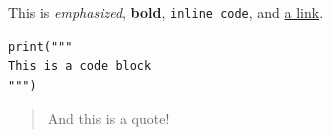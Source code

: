 

This is \textit{emphasized}, \textbf{bold}, \texttt{inline code}, and \href{https://Wikipedia.org}{a link}.

\begin{verbatim}
print("""
This is a code block
""")
\end{verbatim}

\begin{quote}
And this is a quote!
\end{quote}
